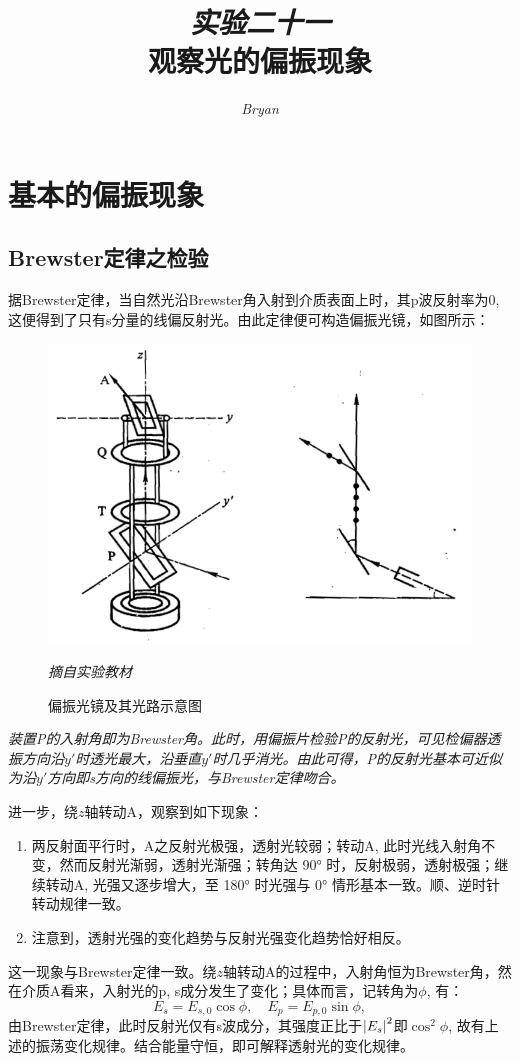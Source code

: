 \documentclass[a4paper,10pt]{article}
\title{\textit{\large 实验二十一}\\[2mm]
		\textbf{\LARGE 观察光的偏振现象}}
\author{\textit{Bryan}}
\date{}
\begin{document}
\maketitle
\thispagestyle{fancy}
\section{基本的偏振现象}
\subsection{Brewster定律之检验}
	据Brewster定律，当自然光沿Brewster角入射到介质表面上时，其p波反射率为0, 这便得到了只有s分量的线偏反射光。由此定律便可构造偏振光镜，如图所示：
	\begin{figure}[!h]
	\centering
	\includegraphics[width=.5\linewidth]{brewster}
	\caption{偏振光镜及其光路示意图}
	\small\itshape 摘自实验教材
	\end{figure}\FloatBarrier\itshape
	装置P的入射角即为Brewster角。此时，用偏振片检验P的反射光，可见检偏器透振方向沿$y'$时透光最大，沿垂直$y'$时几乎消光。由此可得，P的反射光基本可近似为沿$y'$方向即s方向的线偏振光，与Brewster定律吻合。\normalfont
	
	进一步，绕$z$轴转动A，观察到如下现象：
	\begin{enumerate}
	\item 两反射面平行时，A之反射光极强，透射光较弱；转动A, 此时光线入射角不变，然而反射光渐弱，透射光渐强；转角达 \ang{90} 时，反射极弱，透射极强；继续转动A, 光强又逐步增大，至 \ang{180} 时光强与 \ang{0} 情形基本一致。顺、逆时针转动规律一致。
	\item 注意到，透射光强的变化趋势与反射光强变化趋势恰好相反。
	\end{enumerate}
	
	这一现象与Brewster定律一致。绕$z$轴转动A的过程中，入射角恒为Brewster角，然在介质A看来，入射光的p, s成分发生了变化；具体而言，记转角为$\phi$, 有：
	\[ E_s = E_{s,0} \cos\phi,\quad
		E_p = E_{p,0} \sin\phi, \]
	由Brewster定律，此时反射光仅有s波成分，其强度正比于$\abs{E_s}^2$即$\cos^2\phi$, 故有上述的振荡变化规律。结合能量守恒，即可解释透射光的变化规律。
\pagebreak[1]
	
\end{document}
